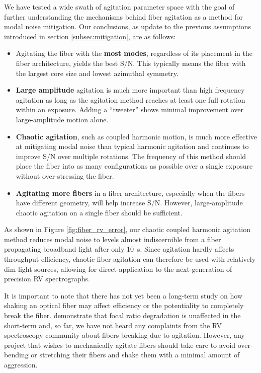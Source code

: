 \documentclass[twocolumn]{emulateapj}
\begin{document}
We have tested a wide swath of agitation parameter space with the goal of further understanding the mechanisms behind fiber agitation as a method for modal noise mitigation. Our conclusions, as update to the previous assumptions introduced in section \ref{subsec:mitigation}, are as follows:
\begin{itemize}
\item Agitating the fiber with the \textbf{most modes}, regardless of its placement in the fiber architecture, yields the best S/N. This typically means the fiber with the largest core size and lowest azimuthal symmetry.
\item \textbf{Large amplitude} agitation is much more important than high frequency agitation as long as the agitation method reaches at least one full rotation within an exposure. Adding a ``tweeter'' shows minimal improvement over large-amplitude motion alone.
\item \textbf{Chaotic agitation}, such as coupled harmonic motion, is much more effective at mitigating modal noise than typical harmonic agitation and continues to improve S/N over multiple rotations. The frequency of this method should place the fiber into as many configurations as possible over a single exposure without over-stressing the fiber.
\item \textbf{Agitating more fibers} in a fiber architecture, especially when the fibers have different geometry, will help increase S/N. However, large-amplitude chaotic agitation on a single fiber should be sufficient.
\end{itemize}

As shown in Figure \ref{fig:fiber_rv_error}, our chaotic coupled harmonic agitation method reduces modal noise to levels almost indiscernible from a fiber propagating broadband light after only \SI{10}{\second}. Since agitation hardly affects throughput efficiency, chaotic fiber agitation can therefore be used with relatively dim light sources, allowing for direct application to the next-generation of precision RV spectrographs.

It is important to note that there has not yet been a long-term study on how shaking an optical fiber may affect efficiency or the potentiality to completely break the fiber. \citet{Sablowski2015} demonstrate that focal ratio degradation is unaffected in the short-term and, so far, we have not heard any complaints from the RV spectroscopy community about fibers breaking due to agitation. However, any project that wishes to mechanically agitate fibers should take care to avoid over-bending or stretching their fibers and shake them with a minimal amount of aggression.
\end{document}
